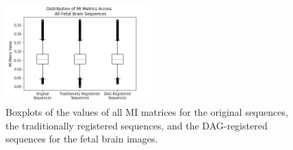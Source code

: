 \clearpage

\begin{figure}
\centering
\includegraphics[width=0.5\textwidth]{6/figures/fetal-brain-mi-box.png}
\caption{Boxplots of the values of all MI matrices for the original sequences, the traditionally registered sequences, and the DAG-registered sequences for the fetal brain images.}
\label{fig:fetal-brain-mi-box}
\end{figure}


